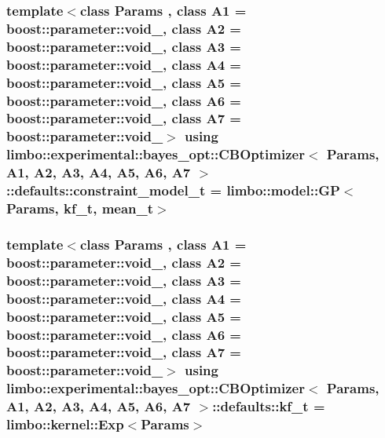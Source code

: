 \subsubsection[{constraint\+\_\+model\+\_\+t}]{\setlength{\rightskip}{0pt plus 5cm}template$<$class Params , class A1  = boost\+::parameter\+::void\+\_\+, class A2  = boost\+::parameter\+::void\+\_\+, class A3  = boost\+::parameter\+::void\+\_\+, class A4  = boost\+::parameter\+::void\+\_\+, class A5  = boost\+::parameter\+::void\+\_\+, class A6  = boost\+::parameter\+::void\+\_\+, class A7  = boost\+::parameter\+::void\+\_\+$>$ using {\bf limbo\+::experimental\+::bayes\+\_\+opt\+::\+C\+B\+Optimizer}$<$ Params, A1, A2, A3, A4, A5, A6, A7 $>$\+::{\bf defaults\+::constraint\+\_\+model\+\_\+t} =  {\bf limbo\+::model\+::\+G\+P}$<$Params, {\bf kf\+\_\+t}, {\bf mean\+\_\+t}$>$}\label{structlimbo_1_1experimental_1_1bayes__opt_1_1_c_b_optimizer_1_1defaults_a732a30715b9697aad5c6587cca6acfd3}
\hypertarget{structlimbo_1_1experimental_1_1bayes__opt_1_1_c_b_optimizer_1_1defaults_aa9c7a3f40bfc804bb27aff96a162ccaf}{}
\subsubsection[{kf\+\_\+t}]{\setlength{\rightskip}{0pt plus 5cm}template$<$class Params , class A1  = boost\+::parameter\+::void\+\_\+, class A2  = boost\+::parameter\+::void\+\_\+, class A3  = boost\+::parameter\+::void\+\_\+, class A4  = boost\+::parameter\+::void\+\_\+, class A5  = boost\+::parameter\+::void\+\_\+, class A6  = boost\+::parameter\+::void\+\_\+, class A7  = boost\+::parameter\+::void\+\_\+$>$ using {\bf limbo\+::experimental\+::bayes\+\_\+opt\+::\+C\+B\+Optimizer}$<$ Params, A1, A2, A3, A4, A5, A6, A7 $>$\+::{\bf defaults\+::kf\+\_\+t} =  {\bf limbo\+::kernel\+::\+Exp}$<$Params$>$}\label{structlimbo_1_1experimental_1_1bayes__opt_1_1_c_b_optimizer_1_1defaults_aa9c7a3f40bfc804bb27aff96a162ccaf}
\hypertarget{structlimbo_1_1experimental_1_1bayes__opt_1_1_c_b_optimizer_1_1defaults_a102b232d75c97267704fa717bdeb8a9f}{}
